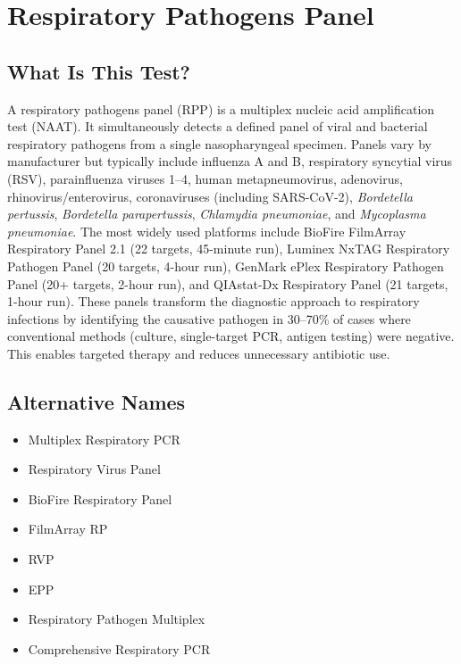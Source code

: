 \chapter{Respiratory Pathogens Panel}

\section*{What Is This Test?}
A respiratory pathogens panel (RPP) is a multiplex nucleic acid amplification test (NAAT). It simultaneously detects a defined panel of viral and bacterial respiratory pathogens from a single nasopharyngeal specimen. Panels vary by manufacturer but typically include influenza A and B, respiratory syncytial virus (RSV), parainfluenza viruses 1--4, human metapneumovirus, adenovirus, rhinovirus/enterovirus, coronaviruses (including SARS-CoV-2), \textit{Bordetella pertussis}, \textit{Bordetella parapertussis}, \textit{Chlamydia pneumoniae}, and \textit{Mycoplasma pneumoniae}. The most widely used platforms include BioFire FilmArray Respiratory Panel 2.1 (22 targets, 45-minute run), Luminex NxTAG Respiratory Pathogen Panel (20 targets, 4-hour run), GenMark ePlex Respiratory Pathogen Panel (20+ targets, 2-hour run), and QIAstat-Dx Respiratory Panel (21 targets, 1-hour run). These panels transform the diagnostic approach to respiratory infections by identifying the causative pathogen in 30--70\% of cases where conventional methods (culture, single-target PCR, antigen testing) were negative. This enables targeted therapy and reduces unnecessary antibiotic use.

\section*{Alternative Names}
\begin{itemize}
  \item Multiplex Respiratory PCR
  \item Respiratory Virus Panel
  \item BioFire Respiratory Panel
  \item FilmArray RP
  \item RVP
  \item EPP
  \item Respiratory Pathogen Multiplex
  \item Comprehensive Respiratory PCR
\end{itemize}
